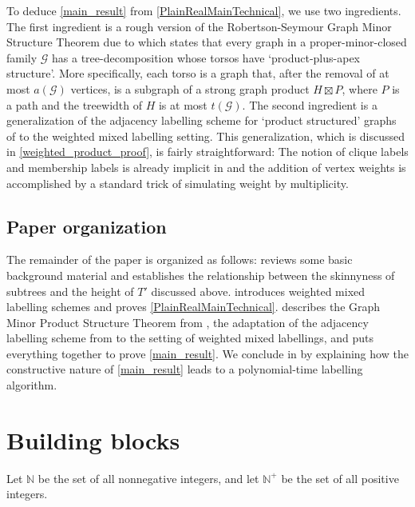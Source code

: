 \documentclass{patmorin}
\newcommand{\defin}[1]{\emph{\textcolor{brightmaroon}{#1}}}
\newcommand{\NN}{\mathbb{N}}
\begin{document}
  To deduce \cref{main_result} from \cref{PlainRealMainTechnical}, we use two ingredients.  The first ingredient is a rough
  version of the Robertson-Seymour Graph Minor Structure Theorem due to \citet{dujmovic.joret.ea:planar} which states that every graph in a proper-minor-closed family $\mathcal{G}$ has a tree-decomposition whose torsos have `product-plus-apex structure'. More specifically, each torso is a graph that, after the removal of at most $a(\mathcal{G})$ vertices, is a subgraph of a strong graph product $H\boxtimes P$, where $P$ is a path and the treewidth of $H$ is at most $t(\mathcal{G})$.  The second ingredient is a generalization of the adjacency labelling scheme for `product structured' graphs of \citet{dujmovic.esperet.ea:adjacency} to the weighted mixed labelling setting.  This generalization, which is discussed in \cref{weighted_product_proof}, is fairly straightforward: The notion of clique labels and membership labels is already implicit in \cite{dujmovic.esperet.ea:adjacency} and the addition of vertex weights is accomplished by a standard trick of simulating weight by multiplicity.

\subsection{Paper organization}

  The remainder of the paper is organized as follows:   reviews some basic background material and establishes the relationship between the skinnyness of subtrees and the height of $T'$ discussed above.   introduces weighted mixed labelling schemes and proves \cref{PlainRealMainTechnical}.   describes the Graph Minor Product Structure Theorem from \cite{dujmovic.joret.ea:planar}, the adaptation of the adjacency labelling scheme from \cite{dujmovic.esperet.ea:adjacency} to the setting of weighted mixed labellings, and puts everything together to prove \cref{main_result}. We conclude in  by explaining how the constructive nature of \cref{main_result} leads to a
polynomial-time labelling algorithm.

  \section{Building blocks}\label{building_blocks}

Let \defin{$\NN$} be the set of all nonnegative integers, and let \defin{$\NN^+$} be the set of all positive integers.
\end{document}
